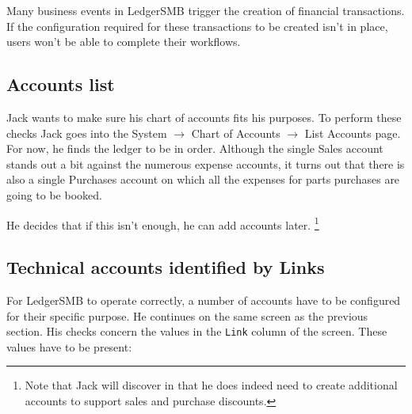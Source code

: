 Many business events in LedgerSMB trigger the creation of financial transactions.
If the configuration required for these transactions to be created isn't in place,
users won't be able to complete their workflows. 

\subsection{Accounts list}

Jack wants to make sure his chart of accounts fits his purposes. To perform these
checks Jack goes into the System $\rightarrow$ Chart of Accounts $\rightarrow$
List Accounts page. For now, he finds
the ledger to be in order. Although the single Sales account stands out a bit against
the numerous expense accounts, it turns out that there is also a single Purchases
account on which all the expenses for parts purchases are going to be booked.

He decides that if this isn't enough, he can add accounts later.
\footnote{Note that Jack will discover in  that
he does indeed need to create additional accounts to support sales and
purchase discounts.}

\subsection{Technical accounts identified by Links}

For LedgerSMB to operate correctly, a number of accounts have to be configured for
their specific purpose. He continues on the same screen as the previous section. His
checks concern the values in the \texttt{Link} column of the screen. These values have
to be present:

